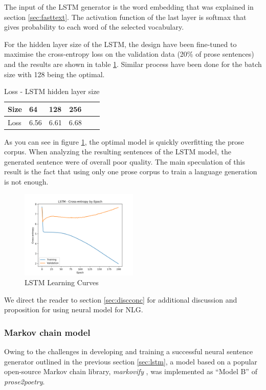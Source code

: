 \documentclass[11pt,a4paper]{article}
\begin{document}
The input of the LSTM generator is the word embedding that was explained in section \ref{sec:fasttext}. The activation function of the last layer is softmax that gives probability to each word of the selected vocabulary. 

For the hidden layer size of the LSTM, the design have been fine-tuned to maximise the cross-entropy loss on the validation data (20\% of prose sentences) and the results are shown in table \ref{table:HiddenLayerSizeLSTM}. Similar process have been done for the batch size with 128 being the optimal.
\begin{table}[ht]
\centering
\begin{tabular}{lll c c c}
	\hline\hline
	Size & 64 & 128 & 256 \\ [0.5ex]
	\hline
	Loss & 6.56 & 6.61 & 6.68 \\ [0.5ex]
	\hline\hline
\end{tabular}
\caption{Loss - LSTM hidden layer size}
\label{table:HiddenLayerSizeLSTM}
\end{table}

As you can see in figure \ref{fig:LearningCurves}, the optimal model is quickly overfitting the prose corpus. When analyzing the resulting sentences of the LSTM model, the generated sentence were of overall poor quality. The main speculation of this result is the fact that using only one prose corpus to train a language generation is not enough.

\begin{figure}[h]
    \centering
    \includegraphics[width=0.5\textwidth]{LSTM_Loss.png}
    \caption{LSTM Learning Curves}
    \label{fig:LearningCurves}
\end{figure}

We direct the reader to section \ref{sec:discconc} for additional discussion and proposition for using neural model for NLG.

\subsubsection{Markov chain model}
\label{sec:markov}
Owing to the challenges in developing and training a successful neural sentence generator outlined in the previous section \ref{sec:lstm}, a model based on a popular open-source Markov chain library, \textit{markovify} \cite{markovify}, was implemented as ``Model B'' of \textit{prose2poetry}.
\end{document}

